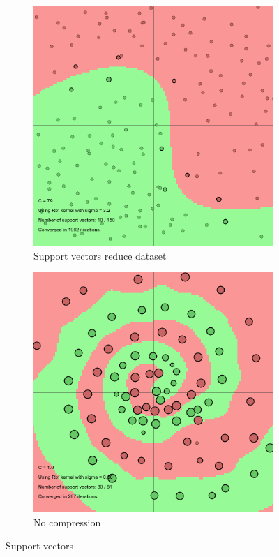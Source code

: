 \documentclass[11pt, a4paper]{article}
\begin{document}
\begin{figure}[H]
    \centering
    \begin{subfigure}{.5\textwidth}
      \centering
      \includegraphics[width=0.9\linewidth]{1-2-1-kernel7.png}
      \caption{Support vectors reduce dataset}
      \label{fig:ker7reduced}
    \end{subfigure}%
    \begin{subfigure}{.5\textwidth}
      \centering
      \includegraphics[width=0.9\linewidth]{1-2-1-kernel7spiral.png}
      \caption{No compression}
      \label{fig:ker7spiral}
    \end{subfigure}
    \caption{Support vectors}
    \label{fig:ker7}
\end{figure}
\end{document}
